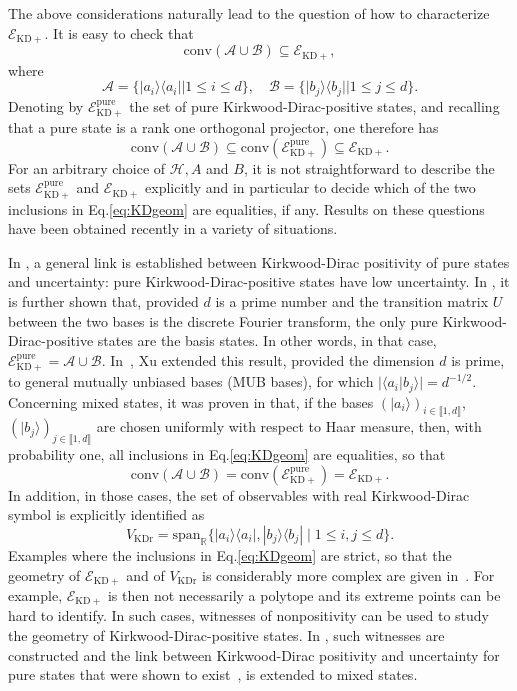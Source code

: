 \documentclass[a4paper, notitlepage, 11pt]{article}
\numberwithin{equation}{section}
\newcommand{\cket}[1]{|#1\rangle}
\newcommand{\mcl}[1]{\ensuremath{\mathcal{#1}}}
\newcommand{\Acal}{{\mcl A}}
\newcommand{\Bcal}{{\mcl B}}
\newcommand{\EcalKDC}{{\mcl E}_{\mathrm{KD+}}}
\newcommand{\EcalKDCpu}{{\mcl E}_{\mathrm{KD+}}^{\mathrm{pure}}}
\newcommand{\spanR}{{\mathrm{span}_{\R}}}
\newcommand{\Hcal}{{\mcl H}}
\newcommand{\R}{\mathbb{R}}
\newcommand{\conv}[1]{\mathrm{conv}\left(#1\right)}
\newcommand{\VR}{V_{\mathrm{KDr}}}
\newcommand{\IntEnt}[2]{\llbracket #1 , #2 \rrbracket}
\newcommand{\convAB}{\conv{\Acal \cup \Bcal}}
\begin{document}
The above considerations naturally lead to the question of how to  characterize $\EcalKDC$.
It is easy to check that 
\begin{equation}
    \convAB\subseteq \EcalKDC,
\end{equation}
where
\begin{equation}
    \Acal=\{|a_i\rangle\langle a_i||1\leq i\leq d\},\quad \Bcal=\{|b_j\rangle\langle b_j| |1\leq j\leq d\}.
\end{equation}
Denoting by $\EcalKDCpu$ the set of pure Kirkwood-Dirac-positive states, and recalling that a pure state is a rank one orthogonal projector, one therefore has
\begin{equation}\label{eq:KDgeom}
    \convAB\subseteq \conv{\EcalKDCpu}\subseteq \EcalKDC.
\end{equation}
For an arbitrary choice of $\Hcal, A$ and $B$, it is not straightforward to describe the sets $\EcalKDCpu$ and $\EcalKDC$ explicitly and in particular to decide which of the two inclusions in Eq.\eqref{eq:KDgeom} are equalities, if any.  Results on these questions have been obtained recently in a variety of situations. 

In \cite{arvidsson-shukuretal2021,debievre2021,DeB23}, a general link is established between Kirkwood-Dirac positivity of pure states and uncertainty: pure Kirkwood-Dirac-positive states have low uncertainty. In
\cite{DeB23}, it is further shown that, provided $d$ is a prime number and the transition matrix $U$ between the two bases is  the discrete Fourier transform, the only pure Kirkwood-Dirac-positive states are the basis states. In other words, in that case, $\EcalKDCpu=\Acal\cup\Bcal$. In~\cite{XU2024}, Xu extended this result, provided the dimension $d$ is prime,   to general mutually unbiased bases (MUB bases), for which $|\langle a_i|b_j\rangle|=d^{-1/2}$.
Concerning mixed states, it was proven in \cite{langrenezetal2024}  that, if the bases $(\cket{a_i})_{i\in\IntEnt{1}{d}}$, $(\cket{b_j})_{j\in\IntEnt{1}{d}}$ are chosen uniformly with respect to Haar measure, then, with probability one, all inclusions in Eq.\eqref{eq:KDgeom} are equalities, so that
\begin{equation}\label{eq:simple}
    \convAB= \conv{\EcalKDCpu} = \EcalKDC.
\end{equation}
In addition, in those cases, the set of observables with real Kirkwood-Dirac symbol is explicitly identified as
$$
\VR=\spanR{\{|a_i\rangle\langle a_i|, |b_j\rangle\langle b_j|\mid 1\leq i,j\leq d\}}.
$$
Examples where the inclusions in Eq.\eqref{eq:KDgeom} are strict, so that the geometry of $\EcalKDC$ and of $\VR$ is considerably more complex are given in~\cite{langrenez2023characterizing2}. For example, $\EcalKDC$ is then not necessarily a polytope and its extreme points can be hard to identify. In such cases, witnesses of nonpositivity can be used to study the geometry of Kirkwood-Dirac-positive states.
In \cite{langrenezetal2024a}, 
 such witnesses are constructed and the link between Kirkwood-Dirac positivity and uncertainty for pure states that were shown to exist~\cite{DeB23}, is extended to mixed states. 
 
\end{document}
